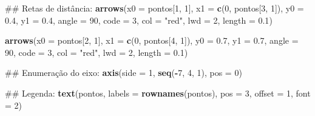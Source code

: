 \documentclass[]{book}
\newenvironment{Shaded}{\begin{snugshade}}{\end{snugshade}}
\newcommand{\KeywordTok}[1]{\textcolor[rgb]{0.13,0.29,0.53}{\textbf{#1}}}
\newcommand{\DataTypeTok}[1]{\textcolor[rgb]{0.13,0.29,0.53}{#1}}
\newcommand{\DecValTok}[1]{\textcolor[rgb]{0.00,0.00,0.81}{#1}}
\newcommand{\FloatTok}[1]{\textcolor[rgb]{0.00,0.00,0.81}{#1}}
\newcommand{\StringTok}[1]{\textcolor[rgb]{0.31,0.60,0.02}{#1}}
\newcommand{\OperatorTok}[1]{\textcolor[rgb]{0.81,0.36,0.00}{\textbf{#1}}}
\newcommand{\NormalTok}[1]{#1}
\begin{document}
\begin{Shaded}
\begin{Highlighting}[]
\NormalTok{##  Retas de distância:}
\KeywordTok{arrows}\NormalTok{(}\DataTypeTok{x0 =}\NormalTok{ pontos[}\DecValTok{1}\NormalTok{, }\DecValTok{1}\NormalTok{], }\DataTypeTok{x1 =} \KeywordTok{c}\NormalTok{(}\DecValTok{0}\NormalTok{, pontos[}\DecValTok{3}\NormalTok{, }\DecValTok{1}\NormalTok{]),}
       \DataTypeTok{y0 =} \FloatTok{0.4}\NormalTok{, }\DataTypeTok{y1 =} \FloatTok{0.4}\NormalTok{,}
       \DataTypeTok{angle =} \DecValTok{90}\NormalTok{, }\DataTypeTok{code =} \DecValTok{3}\NormalTok{, }\DataTypeTok{col =} \StringTok{"red"}\NormalTok{, }\DataTypeTok{lwd =} \DecValTok{2}\NormalTok{, }\DataTypeTok{length =} \FloatTok{0.1}\NormalTok{)}

\KeywordTok{arrows}\NormalTok{(}\DataTypeTok{x0 =}\NormalTok{ pontos[}\DecValTok{2}\NormalTok{, }\DecValTok{1}\NormalTok{], }\DataTypeTok{x1 =} \KeywordTok{c}\NormalTok{(}\DecValTok{0}\NormalTok{, pontos[}\DecValTok{4}\NormalTok{, }\DecValTok{1}\NormalTok{]),}
       \DataTypeTok{y0 =} \FloatTok{0.7}\NormalTok{, }\DataTypeTok{y1 =} \FloatTok{0.7}\NormalTok{,}
       \DataTypeTok{angle =} \DecValTok{90}\NormalTok{, }\DataTypeTok{code =} \DecValTok{3}\NormalTok{, }\DataTypeTok{col =} \StringTok{"red"}\NormalTok{, }\DataTypeTok{lwd =} \DecValTok{2}\NormalTok{, }\DataTypeTok{length =} \FloatTok{0.1}\NormalTok{)}

\NormalTok{##  Enumeração do eixo:}
\KeywordTok{axis}\NormalTok{(}\DataTypeTok{side =} \DecValTok{1}\NormalTok{, }\KeywordTok{seq}\NormalTok{(}\OperatorTok{-}\DecValTok{7}\NormalTok{, }\DecValTok{4}\NormalTok{, }\DecValTok{1}\NormalTok{), }\DataTypeTok{pos =} \DecValTok{0}\NormalTok{)}

\NormalTok{##  Legenda:}
\KeywordTok{text}\NormalTok{(pontos, }\DataTypeTok{labels =} \KeywordTok{rownames}\NormalTok{(pontos), }\DataTypeTok{pos =} \DecValTok{3}\NormalTok{, }\DataTypeTok{offset =} \DecValTok{1}\NormalTok{, }\DataTypeTok{font =} \DecValTok{2}\NormalTok{)}


\end{Highlighting}
\end{Shaded}
\end{document}
